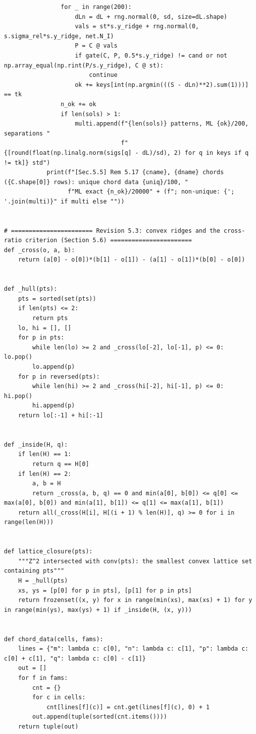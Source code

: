 \documentclass[11pt,a4paper]{article}
\theoremstyle{definition}
\theoremstyle{remark}
\begin{document}
\begin{lstlisting}
                for _ in range(200):
                    dLn = dL + rng.normal(0, sd, size=dL.shape)
                    vals = st*s.y_ridge + rng.normal(0, s.sigma_rel*s.y_ridge, net.N_I)
                    P = C @ vals
                    if gate(C, P, 0.5*s.y_ridge) != cand or not np.array_equal(np.rint(P/s.y_ridge), C @ st):
                        continue
                    ok += keys[int(np.argmin(((S - dLn)**2).sum(1)))] == tk
                n_ok += ok
                if len(sols) > 1:
                    multi.append(f"{len(sols)} patterns, ML {ok}/200, separations "
                                 f"{[round(float(np.linalg.norm(sigs[q] - dL)/sd), 2) for q in keys if q != tk]} std")
            print(f"[Sec.5.5] Rem 5.17 {cname}, {dname} chords ({C.shape[0]} rows): unique chord data {uniq}/100, "
                  f"ML exact {n_ok}/20000" + (f"; non-unique: {'; '.join(multi)}" if multi else ""))


# ======================= Revision 5.3: convex ridges and the cross-ratio criterion (Section 5.6) =======================
def _cross(o, a, b):
    return (a[0] - o[0])*(b[1] - o[1]) - (a[1] - o[1])*(b[0] - o[0])


def _hull(pts):
    pts = sorted(set(pts))
    if len(pts) <= 2:
        return pts
    lo, hi = [], []
    for p in pts:
        while len(lo) >= 2 and _cross(lo[-2], lo[-1], p) <= 0: lo.pop()
        lo.append(p)
    for p in reversed(pts):
        while len(hi) >= 2 and _cross(hi[-2], hi[-1], p) <= 0: hi.pop()
        hi.append(p)
    return lo[:-1] + hi[:-1]


def _inside(H, q):
    if len(H) == 1:
        return q == H[0]
    if len(H) == 2:
        a, b = H
        return _cross(a, b, q) == 0 and min(a[0], b[0]) <= q[0] <= max(a[0], b[0]) and min(a[1], b[1]) <= q[1] <= max(a[1], b[1])
    return all(_cross(H[i], H[(i + 1) % len(H)], q) >= 0 for i in range(len(H)))


def lattice_closure(pts):
    """Z^2 intersected with conv(pts): the smallest convex lattice set containing pts"""
    H = _hull(pts)
    xs, ys = [p[0] for p in pts], [p[1] for p in pts]
    return frozenset((x, y) for x in range(min(xs), max(xs) + 1) for y in range(min(ys), max(ys) + 1) if _inside(H, (x, y)))


def chord_data(cells, fams):
    lines = {"m": lambda c: c[0], "n": lambda c: c[1], "p": lambda c: c[0] + c[1], "q": lambda c: c[0] - c[1]}
    out = []
    for f in fams:
        cnt = {}
        for c in cells:
            cnt[lines[f](c)] = cnt.get(lines[f](c), 0) + 1
        out.append(tuple(sorted(cnt.items())))
    return tuple(out)



\end{lstlisting}
\end{document}
